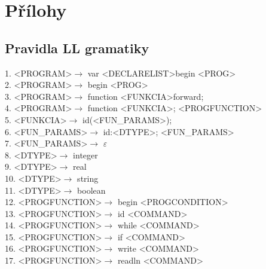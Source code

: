\documentclass[12pt,a4paper,titlepage,final]{report}
\begin{document}
\chapter{Přílohy} \label{prilohy}
\section{Pravidla LL gramatiky}
1. \textless PROGRAM\textgreater  $\rightarrow$ var \textless DECLARELIST\textgreater  begin \textless PROG\textgreater \\
2. \textless PROGRAM\textgreater  $\rightarrow$ begin \textless PROG\textgreater \\
3. \textless PROGRAM\textgreater  $\rightarrow$ function \textless FUNKCIA\textgreater  forward; \\
4. \textless PROGRAM\textgreater  $\rightarrow$ function \textless FUNKCIA\textgreater ; \textless PROGFUNCTION\textgreater \\
5. \textless FUNKCIA\textgreater  $\rightarrow$ id(\textless FUN\_PARAMS\textgreater ); \\
6. \textless FUN\_PARAMS\textgreater  $\rightarrow$ id:\textless DTYPE\textgreater ; \textless FUN\_PARAMS\textgreater \\
7. \textless FUN\_PARAMS\textgreater  $\rightarrow$ $\varepsilon$ \\
8. \textless DTYPE\textgreater  $\rightarrow$ integer \\
9. \textless DTYPE\textgreater  $\rightarrow$ real \\
10. \textless DTYPE\textgreater  $\rightarrow$ string \\
11. \textless DTYPE\textgreater  $\rightarrow$ boolean \\
12. \textless PROGFUNCTION\textgreater  $\rightarrow$ begin \textless PROGCONDITION\textgreater \\
13. \textless PROGFUNCTION\textgreater  $\rightarrow$ id \textless COMMAND\textgreater \\
14. \textless PROGFUNCTION\textgreater  $\rightarrow$ while \textless COMMAND\textgreater \\
15. \textless PROGFUNCTION\textgreater  $\rightarrow$ if \textless COMMAND\textgreater \\
16. \textless PROGFUNCTION\textgreater  $\rightarrow$ write \textless COMMAND\textgreater \\
17. \textless PROGFUNCTION\textgreater  $\rightarrow$ readln \textless COMMAND\textgreater \\
\end{document}

